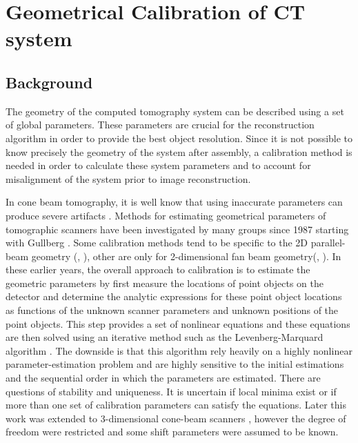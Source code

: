 \chapter{Geometrical Calibration of CT system}
\label{chap:calibration}

\section{Background}
The geometry of the computed tomography system can be described using a set of global parameters.  These parameters are crucial for the reconstruction algorithm in order to provide the best object resolution.  Since it is not possible to know precisely the geometry of the system after assembly, a calibration method is needed in order to calculate these system parameters and to account for misalignment of the system prior to image reconstruction.  

In cone beam tomography, it is well know that using inaccurate parameters can produce severe artifacts \cite{Li1994a, Li1994b, Wang1998}. Methods for estimating geometrical parameters of tomographic scanners have been investigated by many groups since 1987 starting with Gullberg \citep{Gullberg1987}.  Some calibration methods tend to be specific to the 2D parallel-beam geometry (\citep{Azevedo1990}, \citep{Busemann1987}), other are only for 2-dimensional fan beam geometry(\citep{Crawford1988}, \citep{Hsieh1999} \citep{Gullberg1987}).  In these earlier years, the overall approach to calibration is to estimate the geometric parameters by first measure the locations of point objects on the detector and determine the analytic expressions for these point object locations as functions of the unknown scanner parameters and unknown positions of the point objects.  This step provides a set of nonlinear equations and these equations are then solved using an iterative method such as the Levenberg-Marquard algorithm \cite{Rougee1993}.  The downside is that this algorithm rely heavily on a highly nonlinear parameter-estimation problem and are highly sensitive to the initial estimations and the sequential order in which the parameters are estimated.  There are questions of stability and uniqueness.  It is uncertain if local minima exist or if more than one set of calibration parameters can satisfy the equations.  Later this work was extended to 3-dimensional cone-beam scanners \citep{Gullberg1990}, however the degree of freedom were restricted and some shift parameters were assumed to be known.

